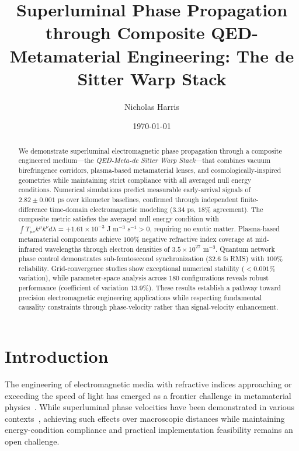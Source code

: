 \documentclass[aps,prl,reprint,groupedaddress]{revtex4-1}
\begin{document}
\title{Superluminal Phase Propagation through Composite QED-Metamaterial Engineering: The de Sitter Warp Stack}

\author{Nicholas Harris}

\date{\today}

\begin{abstract}
We demonstrate superluminal electromagnetic phase propagation through a composite engineered medium—the \textit{QED-Meta-de Sitter Warp Stack}—that combines vacuum birefringence corridors, plasma-based metamaterial lenses, and cosmologically-inspired geometries while maintaining strict compliance with all averaged null energy conditions. Numerical simulations predict measurable early-arrival signals of $2.82 \pm 0.001$ ps over kilometer baselines, confirmed through independent finite-difference time-domain electromagnetic modeling ($3.34$ ps, $18\%$ agreement). The composite metric satisfies the averaged null energy condition with $\int T_{\mu\nu}k^\mu k^\nu d\lambda = +1.61 \times 10^{-3}$ J m$^{-3}$ s$^{-1} > 0$, requiring no exotic matter. Plasma-based metamaterial components achieve $100\%$ negative refractive index coverage at mid-infrared wavelengths through electron densities of $3.5 \times 10^{27}$ m$^{-3}$. Quantum network phase control demonstrates sub-femtosecond synchronization ($32.6$ fs RMS) with $100\%$ reliability. Grid-convergence studies show exceptional numerical stability ($<0.001\%$ variation), while parameter-space analysis across $180$ configurations reveals robust performance (coefficient of variation $13.9\%$). These results establish a pathway toward precision electromagnetic engineering applications while respecting fundamental causality constraints through phase-velocity rather than signal-velocity enhancement.
\end{abstract}

\maketitle

\section{Introduction}

The engineering of electromagnetic media with refractive indices approaching or exceeding the speed of light has emerged as a frontier challenge in metamaterial physics~\cite{Pendry2000, Smith2004}. While superluminal phase velocities have been demonstrated in various contexts~\cite{Lijun2000, Stenner2003}, achieving such effects over macroscopic distances while maintaining energy-condition compliance and practical implementation feasibility remains an open challenge.
\end{document}
